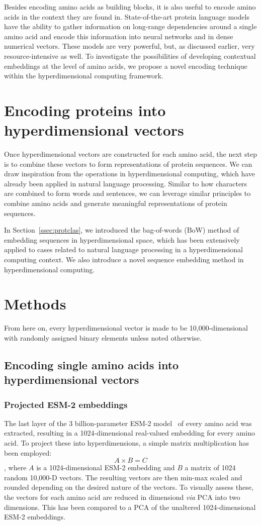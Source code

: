 Besides encoding amino acids as building blocks, it is also useful to encode amino acids in the context they are found in. State-of-the-art protein language models have the ability to gather information on long-range dependencies around a single amino acid and encode this information into neural networks and in dense numerical vectors. These models are very powerful, but, as discussed earlier, very resource-intensive as well. To investigate the possibilities of developing contextual embeddings at the level of amino acids, we propose a novel encoding technique within the hyperdimensional computing framework.

\section{Encoding proteins into hyperdimensional vectors}
Once hyperdimensional vectors are constructed for each amino acid, the next step is to combine these vectors to form representations of protein sequences. We can draw inspiration from the operations in hyperdimensional computing, which have already been applied in natural language processing. Similar to how characters are combined to form words and sentences, we can leverage similar principles to combine amino acids and generate meaningful representations of protein sequences.

In Section~\ref{ssec:protclas}, we introduced the bag-of-words (BoW) method of embedding sequences in hyperdimensional space, which has been extensively applied to cases related to natural language processing in a hyperdimensional computing context. We also introduce a novel sequence embedding method in hyperdimensional computing.

\section{Methods}
From here on, every hyperdimensional vector is made to be 10,000-dimensional with randomly assigned binary elements unless noted otherwise. 
\subsection{Encoding single amino acids into hyperdimensional vectors}
\subsubsection*{Projected ESM-2 embeddings}
The last layer of the 3 billion-parameter ESM-2 model~\cite{esm2} of every amino acid was extracted, resulting in a 1024-dimensional real-valued embedding for every amino acid. To project these into hyperdimensions, a simple matrix multiplication has been employed: \[A \times B = C\],
where $A$ is a 1024-dimensional ESM-2 embedding and $B$ a matrix of 1024 random 10,000-D vectors. The resulting vectors are then min-max scaled and rounded depending on the desired nature of the vectors. To visually assess these, the vectors for each amino acid are reduced in dimensiond \textit{via} PCA into two dimensions. This has been compared to a PCA of the unaltered 1024-dimensional ESM-2 embeddings.
